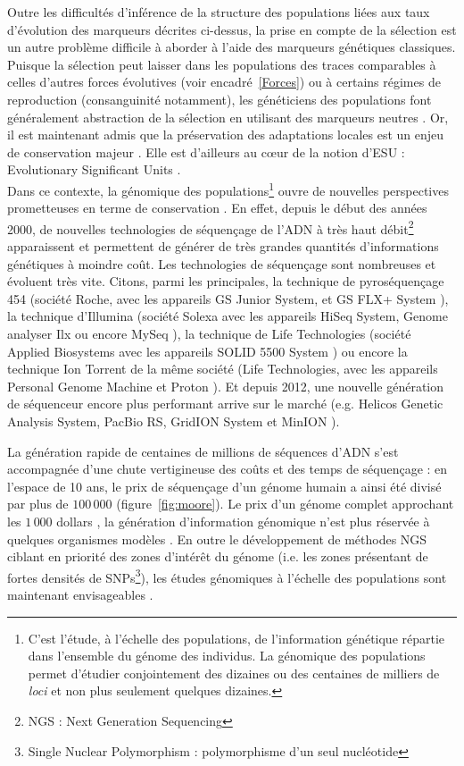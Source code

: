 \documentclass[a4paper,12pt,twoside]{article}\usepackage[]{graphicx}\usepackage[]{color}
\begin{document}
Outre les difficultés d'inférence de la structure des populations liées aux taux d'évolution des marqueurs décrites ci-dessus, la prise en compte de la sélection est un autre problème difficile à aborder à l'aide des marqueurs génétiques classiques. Puisque la sélection peut laisser dans les populations des traces comparables à celles d'autres forces évolutives (voir encadré~\ref{Forces}) ou à certains régimes de reproduction (consanguinité notamment), les généticiens des populations font généralement abstraction de la sélection en utilisant des marqueurs neutres \citep{bazin2006population}. Or, il est maintenant admis que la préservation des adaptations locales est un enjeu de conservation majeur \citep{hallfors2015addressing}. Elle est d'ailleurs au c\oe ur de la notion d'ESU : Evolutionary Significant Units \citep{crandall2000}.\\

Dans ce contexte, la génomique des populations\footnote{C'est l'étude, à l'échelle des populations, de l'information génétique répartie dans l'ensemble du génome des individus. La génomique des populations permet d'étudier conjointement des dizaines ou des centaines de milliers de \emph{loci} et non plus seulement quelques dizaines.} ouvre de nouvelles perspectives prometteuses en terme de conservation \citep{shafer2015genomics, garner2015genomics, luikart2003power}. En effet, depuis le début des années 2000, de nouvelles technologies de séquençage de l'ADN à très haut débit\footnote{NGS : Next Generation Sequencing} apparaissent et permettent de générer de très grandes quantités d'informations génétiques à moindre coût. Les technologies de séquençage sont nombreuses et évoluent très vite. Citons, parmi les principales, la technique de pyroséquençage 454 (société Roche, avec les appareils GS Junior System, et GS FLX+ System \citep{GSFLX}), la technique d'Illumina (société Solexa avec les appareils HiSeq System, Genome analyser Ilx ou encore MySeq \citep{illumina}), la technique de Life Technologies (société Applied Biosystems avec les appareils SOLID 5500 System \citep{shokralla2012next}) ou encore la technique Ion Torrent de la même société (Life Technologies, avec les appareils Personal Genome Machine et Proton \citep{iontorrent}). Et depuis 2012, une nouvelle génération de séquenceur encore plus performant arrive sur le marché (e.g. Helicos Genetic Analysis System, PacBio RS, GridION System et MinION \citep{mikheyev2014first}). 

La génération rapide de centaines de millions de séquences d'ADN s'est accompagnée d'une chute vertigineuse des coûts et des temps de séquençage : en l'espace de 10 ans, le prix de séquençage d'un génome humain a ainsi été divisé par plus de $100\,000$ (figure~\ref{fig:moore}). Le prix d'un génome complet approchant les $1\,000$ dollars \citep{hayden20141}, la génération d'information génomique n'est plus réservée à quelques organismes modèles \citep{ekblom2014field, shafer2015genomics}. En outre le développement de méthodes NGS ciblant en priorité des zones d'intérêt du génome (i.e. les zones présentant de fortes densités de SNPs\footnote{Single Nuclear Polymorphism : polymorphisme d'un seul nucléotide}), les études génomiques à l'échelle des populations sont maintenant envisageables \citep{davey2010radseq}.
\end{document}
